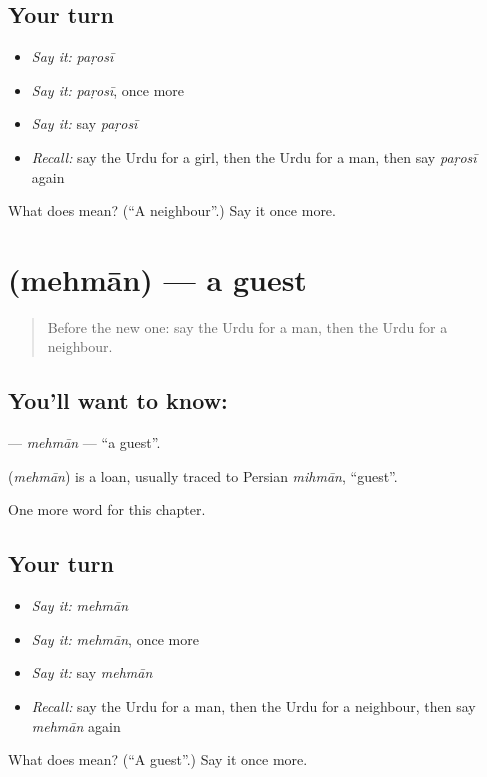 \subsection*{Your turn}
\begin{itemize}
\raggedright
  \item \emph{Say it:} \emph{paṛosī}
  \item \emph{Say it:} \emph{paṛosī}, once more
  \item \emph{Say it:} say \emph{paṛosī}
  \item \emph{Recall:} say the Urdu for a girl, then the Urdu for a man, then say \emph{paṛosī} again
\end{itemize}

\begin{tcolorbox}[breakable,colback=teal!4,colframe=teal!35!black,title={Before you move on}]
What does  mean? (\textquotedblleft{}A neighbour\textquotedblright{}.) Say it once more.
\end{tcolorbox}
\section[\texorpdfstring{\ur{مہمان} (mehmān)}{مہمان (mehmān)}]{ (mehmān) — a guest}

\label{lesson:UR-C45-mehman}



\begin{quote}
Before the new one: say the Urdu for a man, then the Urdu for a neighbour.
\end{quote}

\subsection*{You'll want to know: }
\textbf{} — \emph{mehmān} — \textquotedblleft{}a guest\textquotedblright{}.

\begin{cousinweb}
\textbf{} (\emph{mehmān}) is a loan, usually traced to Persian \emph{mihmān}, \textquotedblleft{}guest\textquotedblright{}.
\end{cousinweb}

\begin{grammarlens}[title={What you've built}]
One more word for this chapter.
\end{grammarlens}

\subsection*{Your turn}
\begin{itemize}
\raggedright
  \item \emph{Say it:} \emph{mehmān}
  \item \emph{Say it:} \emph{mehmān}, once more
  \item \emph{Say it:} say \emph{mehmān}
  \item \emph{Recall:} say the Urdu for a man, then the Urdu for a neighbour, then say \emph{mehmān} again
\end{itemize}

\begin{tcolorbox}[breakable,colback=teal!4,colframe=teal!35!black,title={Before you move on}]
What does  mean? (\textquotedblleft{}A guest\textquotedblright{}.) Say it once more.
\end{tcolorbox}

